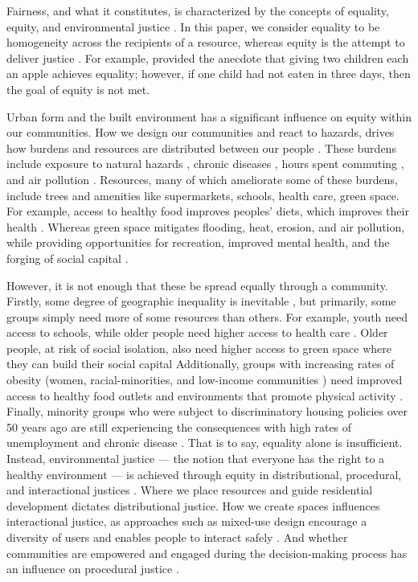 \documentclass[final,3p,times,onecolumn,sort&compress]{elsarticle}
\begin{document}
Fairness, and what it constitutes, is characterized by the concepts of equality, equity, and environmental justice \citep{talen, low, rigolon, lopez}.
In this paper, we consider equality to be homogeneity across the recipients of a resource, whereas equity is the attempt to deliver justice \citep{rumley}.
For example, \cite{rumley} provided the anecdote that giving two children each an apple achieves equality; however, if one child had not eaten in three days, then the goal of equity is not met. 

Urban form and the built environment has a significant influence on equity within our communities.
How we design our communities and react to hazards, drives how burdens and resources are distributed between our people \citep{wilson}.
These burdens include exposure to natural hazards \citep{}, chronic diseases \citep{}, hours spent commuting \citep{}, and air pollution \cite{Maguire2011-fi, Sheriff2020-ge}.
Resources, many of which ameliorate some of these burdens, include trees \citep{nesbit} and amenities like supermarkets, schools, health care, green space.
For example, access to healthy food improves peoples' diets, which improves their health \citep{garcia, kolak}.
Whereas green space mitigates flooding, heat, erosion, and air pollution, while providing opportunities for recreation, improved mental health, and the forging of social capital \cite{Williams2020-greenspace}.

However, it is not enough that these be spread equally through a community.
Firstly, some degree of geographic inequality is inevitable \citep{dadashpoor}, but primarily, some groups simply need more of some resources than others.
For example, youth need access to schools, while older people need higher access to health care \citep{syed}.
Older people, at risk of social isolation, also need higher access to green space where they can build their social capital \citep{frumkin}
Additionally, groups with increasing rates of obesity (women, racial-minorities, and low-income communities \citep{day}) need improved access to healthy food outlets \cite{garcia, Kolak2018-az} and environments that promote physical activity \citep{krenichyn}.
Finally, minority groups who were subject to discriminatory housing policies over 50 years ago are still experiencing the consequences with high rates of unemployment and chronic disease \citep{white-redling}.
That is to say, equality alone is insufficient.
Instead, environmental justice --- the notion that everyone has the right to a healthy environment \citep{lopez} --- is achieved through equity in distributional, procedural, and interactional justices \cite{low}.
Where we place resources and guide residential development dictates distributional justice.
How we create spaces influences interactional justice, as approaches such as mixed-use design encourage a diversity of users and enables people to interact safely \citep{jacobs}.
And whether communities are empowered and engaged during the decision-making process has an influence on procedural justice \citep{low, rigolon}.
\end{document}
